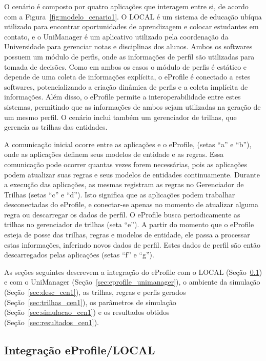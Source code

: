 O cenário é composto por quatro aplicações que interagem entre si, de acordo com a Figura~\ref{fig:modelo_cenario1}. O LOCAL é um sistema de educação ubíqua utilizado para encontrar oportunidades de aprendizagem e colocar estudantes em contato, e o UniManager é um aplicativo utilizado pela coordenação da Universidade para gerenciar notas e disciplinas dos alunos. Ambos os softwares possuem um módulo de perfis, onde as informações de perfil são utilizadas para tomada de decisões. Como em ambos os casos o módulo de perfis é estático e depende de uma coleta de informações explícita, o eProfile é conectado a estes softwares, potencializando a criação dinâmica de perfis e a coleta implícita de informações. Além disso, o eProfile permite a interoperabilidade entre estes sistemas, permitindo que as informações de ambos sejam utilizadas na geração de um mesmo perfil. O cenário inclui também um gerenciador de trilhas, que gerencia as trilhas das entidades. 

A comunicação inicial ocorre entre as aplicações e o eProfile, (setas ``a'' e ``b''), onde as aplicações definem seus modelos de entidade e as regras. Essa comunicação pode ocorrer quantas vezes forem necessárias, pois as aplicações podem atualizar suas regras e seus modelos de entidades continuamente. Durante a execução das aplicações, as mesmas registram as regras no Gerenciador de Trilhas (setas ``c'' e ``d''). Isto significa que as aplicações podem trabalhar desconectadas do eProfile, e conectar-se apenas no momento de atualizar alguma regra ou descarregar os dados de perfil. O eProfile busca periodicamente as trilhas no gerenciador de trilhas (seta ``e''). A partir do momento que o eProfile esteja de posse das trilhas, regras e modelos de entidade, ele passa a processar estas informações, inferindo novos dados de perfil. Estes dados de perfil são então descarregados pelas aplicações (setas ``f'' e ``g'').

As seções seguintes descrevem a integração do eProfile com o LOCAL (Seção~\ref{sec:eprofile_local}) e com o UniManager (Seção~\ref{sec:eprofile_unimanager}), o ambiente da simulação (Seção~\ref{sec:desc_cen1}), as trilhas, regras e perfis gerados (Seção~\ref{sec:trilhas_cen1}), os parâmetros de simulação (Seção~\ref{sec:simulacao_cen1}) e os resultados obtidos (Seção~\ref{sec:resultados_cen1}).


\subsection{Integração eProfile/LOCAL}
\label{sec:eprofile_local}

